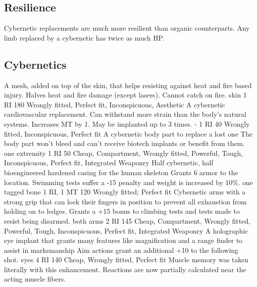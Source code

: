 	\subsection{Resilience}
	Cybernetic replacements are much more resilient than organic counterparts.
	Any limb replaced by a cybernetic has twice as much HP.
\subsection{Cybernetics}
\vspace{10mm}
\begin{multicols}{2}
    {A mesh, added on top of the skin, that helps resisting against heat and fire based injury.}
    {Halves heat and fire damage (except lasers). Cannot catch on fire.}
    {skin}
    {1 RI}
    {180}
    {Wrongly fitted, Perfect fit, Inconspicuous, Aesthetic}
    {A cybernetic cardiovascular replacement. Can withstand more strain than the body's natural systems.}
    {Increases MT by 1. May be implanted up to 3 times.}
    {-}
    {1 RI}
    {40}
    {Wrongly fitted, Inconspicuous, Perfect fit}
    {A cybernetic body part to replace a lost one}
    {The body part won't bleed and can't receive biotech implants or benefit from them.}
    {one extremity}
    {1 RI}
    {50}
    {Cheap, Compartment, Wrongly fitted, Powerful, Tough, Inconspicuous, Perfect fit, Integrated Weaponry}
    {Half cybernetic, half bioengineered hardened casing for the human skeleton}
    {Grants 6 armor to the location. Swimming tests suffer a -15 penalty and weight is increased by 10\%.}
    {one tagged bone}
    {1 RI, 1 MT}
    {120}
    {Wrongly fitted; Perfect fit}
    {Cybernetic arms with a strong grip that can lock their fingers in position to prevent all exhaustion from holding on to ledges.}
    {Grants a +15 bonus to climbing tests and tests made to resist being disarmed.}
    {both arms}
    {2 RI}
    {145}
    {Cheap, Compartment, Wrongly fitted, Powerful, Tough, Inconspicuous, Perfect fit, Integrated Weaponry}
    {A holographic eye implant that grants many features like magnification and a range finder to assist in marksmanship}
    {Aim actions grant an additional +10 to the following shot.}
    {eyes}
    {4 RI}
    {140}
    {Cheap, Wrongly fitted, Perfect fit}
    {Muscle memory was taken literally with this enhancement. Reactions are now partially calculated near the acting muscle fibers.}

\end{multicols}
